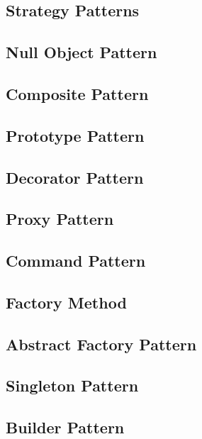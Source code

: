 \documentclass[
    fourColumns,
    landscape,
]{formularyETH/formularyETH}
\begin{document}
\subsection{Strategy Patterns}
\label{subsubsec:StrategyPatterns}

\subsection{Null Object Pattern}
\label{subsubsec:NullObjectPattern}

\subsection{Composite Pattern}
\label{subsubsec:CompositePattern}

\subsection{Prototype Pattern}
\label{subsubsec:PrototypePattern}

\subsection{Decorator Pattern}
\label{subsubsec:DecoratorPattern}

\subsection{Proxy Pattern}
\label{subsubsec:ProxyPattern}

\subsection{Command Pattern}
\label{subsubsec:CommandPattern}

\subsection{Factory Method}
\label{subsubsec:factoryMethod}

\subsection{Abstract Factory Pattern}
\label{subsubsec:Abstractfactory}

\subsection{Singleton Pattern}
\label{subsubsec:singletonPattern}

\subsection{Builder Pattern}
\label{subsubsec:builderPattern}

\end{document}
